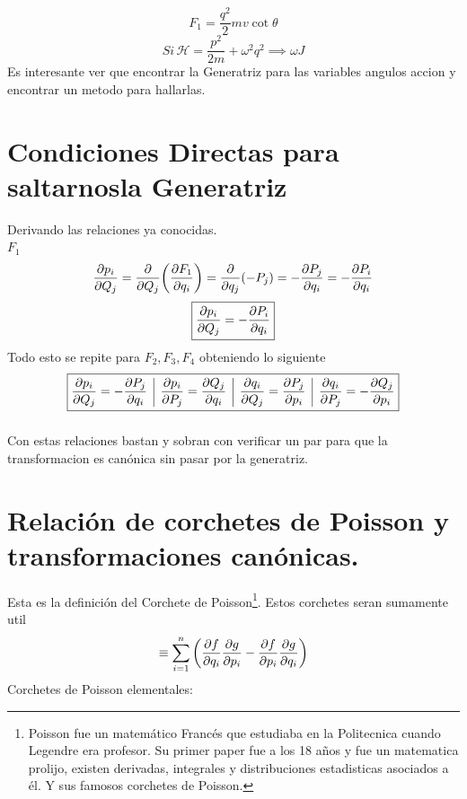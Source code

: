 \documentclass[12pt]{article}
\renewcommand{\H}{\mathcal{H}}
\newcommand{\s}[1]{\section{#1}}
\newcommand{\en}[1]{\[\boxed{#1}\]}
\newcommand{\sumn}[1]{\sum_{#1 =1}^{n}}
\newcommand{\vl}{\,\,\, \vline \,\,\,}
\newcommand{\rojo}[1]{{\color{rojo}#1}}
\begin{document}
\en{F_1 = \frac{q^2}{2}mv \cot{\theta}}
\en{Si\, \H = \frac{p^2}{2m}+\omega^2 q^2 \implies \omega J}
Es interesante ver que encontrar la Generatriz para las variables angulos accion y encontrar un metodo para hallarlas.\\
\s{Condiciones Directas para saltarnosla Generatriz}
Derivando las relaciones ya conocidas. \\
\textbf{$F_1$}\\
\begin{align}
\pdv{p_i}{Q_j}= \pdv{Q_j}\qty(\pdv{F_1}{q_i})= \pdv{q_j}\qty(-P_j)=-\pdv{P_j}{q_i} = -\pdv{P_i}{q_i}\\
\end{align}
\en{\pdv{p_i}{Q_j}= -\pdv{P_i}{q_i}}
Todo esto se repite para $F_2,F_3,F_4$ obteniendo lo siguiente
\rojo{\en{\pdv{p_i}{Q_j}= -\pdv{P_j}{q_i} \vl \pdv{p_i}{P_j}= \pdv{Q_j}{q_i}\vl \pdv{q_i}{Q_j}= \pdv{P_j}{p_i} \vl \pdv{q_i}{P_j}= -\pdv{Q_j}{p_i} }}
\begin{equation}
 \label{eq_en}	
\end{equation}

Con estas relaciones bastan y sobran con verificar un par para que la transformacion es canónica sin pasar por la generatriz.\\

\s{Relación de corchetes de Poisson y transformaciones canónicas.}

Esta es la definición del Corchete de Poisson{\footnote{Poisson fue un matemático Francés que estudiaba en la Politecnica cuando Legendre era profesor. Su primer paper fue a los 18 años y fue un matematica prolijo, existen derivadas, integrales y distribuciones estadisticas asociados a él. Y sus famosos corchetes de Poisson.}}.
Estos corchetes seran sumamente util
\begin{align}
[f,g]\equiv \sumn{i} \qty(\pdv{f}{q_i} \pdv{g}{p_i} - \pdv{f}{p_i} \pdv{g}{q_i})	
\end{align}
Corchetes de Poisson elementales:
\end{document}
